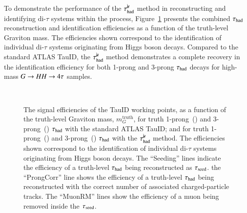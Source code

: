         To demonstrate the performance of the $\tau_\mathrm{had}^{\mu\mkern-10mu\backslash}$ method in reconstructing and 
        identifying di-$\tau$ systems within the \GHHFourtau process, 
        Figure~\ref{fig:murm:effi_mass} presents the combined $\tau_{\text{had}}$ reconstruction and 
        identification efficiencies as a function of the truth-level Graviton mass. 
        The efficiencies shown correspond to the identification of individual di-$\tau$ systems originating from Higgs boson decays.
        Compared to the standard ATLAS TauID, the $\tau_\mathrm{had}^{\mu\mkern-10mu\backslash}$ method demonstrates a complete recovery 
        in the identification efficiency for both 1-prong and 3-prong $\tau_{\text{had}}$ decays for high-mass $G \rightarrow HH \rightarrow 4\tau$ samples.
        \begin{figure}[hbtp]
            \begin{center}
                \\
                \caption{The signal efficiencies of the TauID working points, as a function of the truth-level Graviton mass, $m_G^\mathrm{truth}$, 
                    for truth 1-prong~(\protect{}) and 3-prong~(\protect{}) $\tau_{\text{had}}$ with the standard ATLAS TauID;
                    and for truth 1-prong~(\protect{}) and 3-prong~(\protect{}) $\tau_{\text{had}}$ with the $\tau_\mathrm{had}^{\mu\mkern-10mu\backslash}$ method.
                    The efficiencies shown correspond to the identification of individual di-$\tau$ systems originating from Higgs boson decays.
                    The ``Seeding'' lines indicate the efficiency 
                    of a truth-level $\tau_{\text{had}}$ being reconstructed as $\tau_\mathrm{seed}$. 
                    the ``ProngCorr'' line shows the efficiency of a truth-level $\tau_{\text{had}}$ being 
                    reconstructed with the correct number of associated charged-particle tracks.
                    The ``MuonRM'' lines show the efficiency of 
                    a muon being removed inside the $\tau_\mathrm{seed}$.
                }
                \label{fig:murm:effi_mass}
            \end{center}
        \end{figure}

